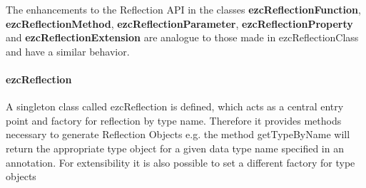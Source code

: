 \documentclass[10pt,final,a4paper,oneside]{article}
\begin{document}
The enhancements to the Reflection API
in the classes
\textbf{ezcReflectionFunction},
\textbf{ezcReflectionMethod},
\textbf{ezcReflectionParameter},
\textbf{ezcReflectionProperty} and
\textbf{ezcReflectionExtension}
are analogue to those made in
ezcReflectionClass
and have a similar behavior.

%
%
%
%


\paragraph{ezcReflection}
A singleton class
called ezcReflection is defined,
which  acts as a central entry point
and factory for reflection by type name.
Therefore it provides methods necessary
to generate Reflection Objects
e.g. the method getTypeByName
will return the appropriate type object
for a given data type name specified in an annotation.
For extensibility it is also possible
to set a different factory for type objects
\end{document}

